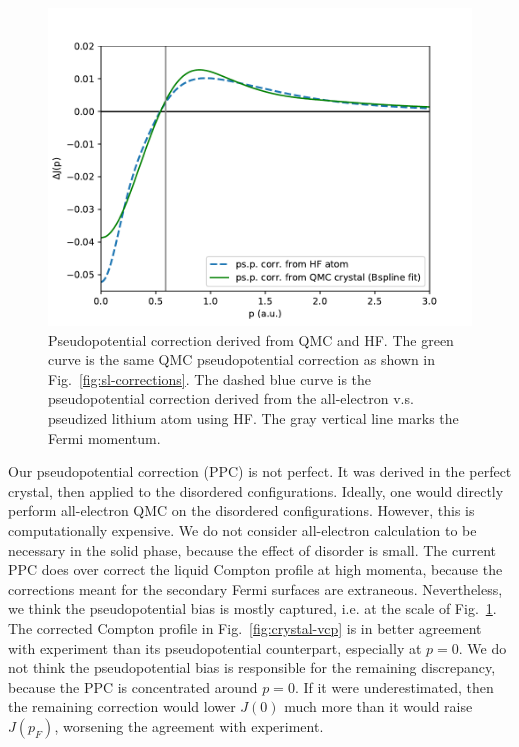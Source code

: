 \documentclass[aps,prb,showpacs,preprintnumbers,amsmath,amssymb,superscriptaddress,twocolumn]{revtex4-1}
\begin{document}
\begin{figure}
\includegraphics[width=\linewidth]{li42c_bfd-dmcppc}
\caption{Pseudopotential correction derived from QMC and HF. The green curve is the same QMC pseudopotential correction as shown in Fig.~\ref{fig:sl-corrections}. The dashed blue curve is the pseudopotential correction derived from the all-electron v.s. pseudized lithium atom using HF. The gray vertical line marks the Fermi momentum. \label{fig:hf-ppc}}
\end{figure}

Our pseudopotential correction (PPC) is not perfect. It was derived in the perfect crystal, then applied to the disordered configurations. Ideally, one would directly perform all-electron QMC on the disordered configurations. However, this is computationally expensive. We do not consider all-electron calculation to be necessary in the solid phase, because the effect of disorder is small. The current PPC does over correct the liquid Compton profile at high momenta, because the corrections meant for the secondary Fermi surfaces are extraneous. Nevertheless, we think the pseudopotential bias is mostly captured, i.e. at the scale of Fig.~\ref{fig:hf-ppc}. The corrected Compton profile in Fig.~\ref{fig:crystal-vcp} is in better agreement with experiment than its pseudopotential counterpart, especially at $p=0$. We do not think the pseudopotential bias is responsible for the remaining discrepancy, because the PPC is concentrated around $p=0$. If it were underestimated, then the remaining correction would lower $J(0)$ much more than it would raise $J(p_F)$, worsening the agreement with experiment. %
\end{document}
